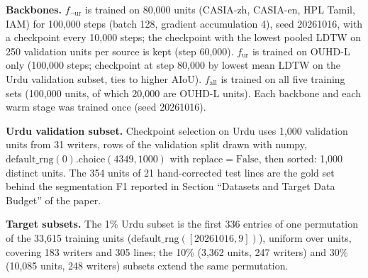 \documentclass[10pt,a4paper]{article}
\newcommand{\fur}{f_{\mathrm{ur}}}
\newcommand{\fall}{f_{\mathrm{all}}}
\newcommand{\fnot}[1]{f_{\neg\mathrm{#1}}}
\begin{document}
\textbf{Backbones.} $\fnot{ur}$ is trained on 80,000 units (CASIA-zh, CASIA-en, HPL Tamil, IAM) for 100,000 steps (batch 128, gradient accumulation 4), seed 20261016, with a checkpoint every 10,000 steps; the checkpoint with the lowest pooled LDTW on 250 validation units per source is kept (step 60,000). $\fur$ is trained on OUHD-L only (100,000 steps; checkpoint at step 80,000 by lowest mean LDTW on the Urdu validation subset, ties to higher AIoU). $\fall$ is trained on all five training sets (100,000 units, of which 20,000 are OUHD-L units). Each backbone and each warm stage was trained once (seed 20261016).

\textbf{Urdu validation subset.} Checkpoint selection on Urdu uses 1,000 validation units from 31 writers, rows of the validation split drawn with numpy, $\mathrm{default\_rng}(0).\mathrm{choice}(4349, 1000)$ with $\mathrm{replace}{=}\mathrm{False}$, then sorted: 1,000 distinct units. The 354 units of 21 hand-corrected test lines are the gold set behind the segmentation F1 reported in Section ``Datasets and Target Data Budget'' of the paper.

\textbf{Target subsets.} The 1\% Urdu subset is the first 336 entries of one permutation of the 33,615 training units ($\mathrm{default\_rng}([20261016, 9])$), uniform over units, covering 183 writers and 305 lines; the 10\% (3,362 units, 247 writers) and 30\% (10,085 units, 248 writers) subsets extend the same permutation.
\end{document}

